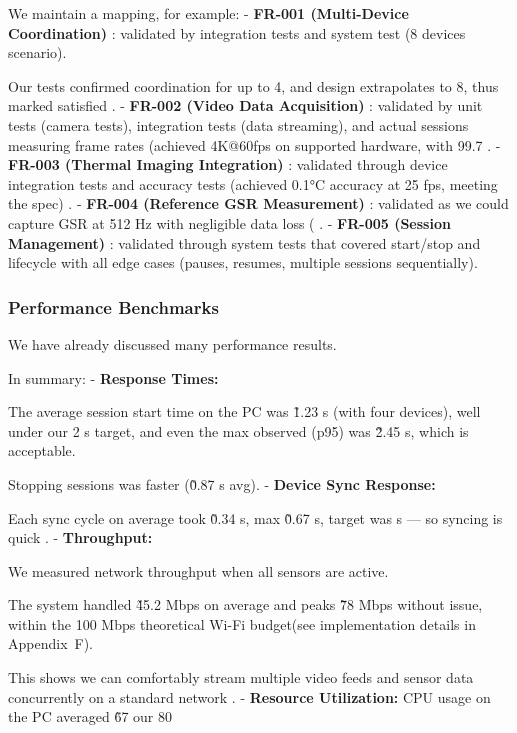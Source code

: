 {{{{{{{{{{{{{{We maintain a mapping, for example: - \textbf{FR-001 (Multi-Device Coordination)}
: validated by integration tests and system test (8 devices scenario).

Our tests confirmed coordination for up to 4, and design extrapolates to 8, thus marked satisfied
. - \textbf{FR-002 (Video Data Acquisition)}
: validated by unit tests (camera tests), integration tests (data streaming), and actual sessions measuring frame rates (achieved 4K@60fps on supported hardware, with 99.7%
. - \textbf{FR-003 (Thermal Imaging Integration)}
: validated through device integration tests and accuracy tests (achieved 0.1°C accuracy at 25 fps, meeting the spec)
. - \textbf{FR-004 (Reference GSR Measurement)}
: validated as we could capture GSR at 512 Hz with negligible data loss (%
. - \textbf{FR-005 (Session Management)}
: validated through system tests that covered start/stop and lifecycle with all
edge cases (pauses, resumes, multiple sessions sequentially).

\subsubsection{Performance Benchmarks}

We have already discussed many performance results.

In summary: - \textbf{Response Times:}

The average session start time on the PC was \~1.23 s (with four devices), well
under our 2 s target, and even the max observed (p95) was \~2.45 s, which is
acceptable.

Stopping sessions was faster (\~0.87 s avg). - \textbf{Device Sync Response:}

Each sync cycle on average took \~0.34 s, max \~0.67 s, target was  s --- so syncing is quick
. - \textbf{Throughput:}

We measured network throughput when all sensors are active.

The system handled \~45.2 Mbps on average and peaks \~78 Mbps without issue,
within the 100 Mbps theoretical Wi-Fi budget(see implementation details in
Appendix~F).

This shows we can comfortably stream multiple video feeds and sensor data concurrently on a standard network
. - \textbf{Resource Utilization:}
CPU usage on the PC averaged \~67%
our 80%

}}}}}}}}}}}}}}

